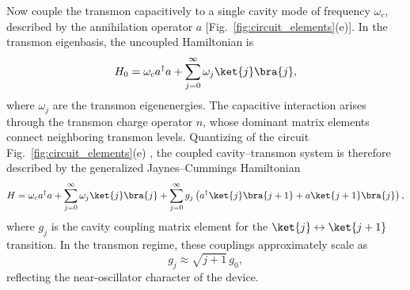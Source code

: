 Now couple the transmon capacitively to a single cavity mode of frequency \(\omega_c\), described by the annihilation operator \(a\) [Fig.~\ref{fig:circuit_elements}(e)]. In the transmon eigenbasis, the uncoupled Hamiltonian is
\begin{equation}
    H_0
    =
    \omega_c a^\dagger a
    +
    \sum_{j=0}^\infty \omega_j \ket{j}\bra{j},
\end{equation}
where \(\omega_j\) are the transmon eigenenergies. The capacitive interaction arises through the transmon charge operator \(n\), whose dominant matrix elements connect neighboring transmon levels. Quantizing of the circuit Fig.~\ref{fig:circuit_elements}(e) \cite{vool2017circuitquantization}, the coupled cavity--transmon system is therefore described by the generalized Jaynes--Cummings Hamiltonian
\begin{equation}
    H
    =
    \omega_c a^\dagger a
    +
    \sum_{j=0}^\infty \omega_j \ket{j}\bra{j}
    +
    \sum_{j=0}^\infty g_j
    \left(
        a^\dagger \ket{j}\bra{j+1}
        +
        a\ket{j+1}\bra{j}
    \right),
    \label{eq:multilevel_JC}
\end{equation}
where \(g_j\) is the cavity coupling matrix element for the \(\ket{j}\leftrightarrow\ket{j+1}\) transition. In the transmon regime, these couplings approximately scale as
\begin{equation}
    g_j \approx \sqrt{j+1}\,g_0,
\end{equation}
reflecting the near-oscillator character of the device.

